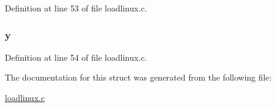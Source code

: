 \-Definition at line 53 of file loadlinux.\-c.

\hypertarget{structatag__videotext_a17f97f62d93bc8cfb4a2b5d273a2aa72}{
\subsubsection[{y}]{ {\bf y}}}\label{structatag__videotext_a17f97f62d93bc8cfb4a2b5d273a2aa72}


\-Definition at line 54 of file loadlinux.\-c.



\-The documentation for this struct was generated from the following file\-:\begin{DoxyCompactItemize}
\item 
\hyperlink{loadlinux_8c}{loadlinux.\-c}\end{DoxyCompactItemize}
